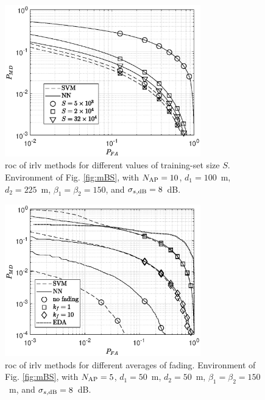 \documentclass[final,twocolumn]{IEEEtran}
\begin{document}
\begin{figure}[t]
    \centering
    \includegraphics[width=8.5cm]{res_training_10BS_2Class_newArea.eps}
    \caption{\ac{roc} of \ac{irlv} methods for different values of training-set size $S$. Environment of Fig. \ref{fig:mBS}, with  $N_{\rm AP}=10$, $d_1 = 100$~m, $d_2 = 225$~m, $\beta_1 = \beta_2 = 150$, and $\sigma_{s,{\rm dB}} = 8$~dB.}
    \label{fig:kf1_newArea}
\end{figure}


\begin{figure}[t]
    \centering
    \includegraphics[width=8.5cm]{res_fading_5BS_2Class.eps}
    \caption{\ac{roc} of \ac{irlv} methods for different averages of fading. Environment of Fig. \ref{fig:mBS}, with  $N_{\rm AP}=5$, $d_1 = 50 $~m, $d_2 = 50$~m, $\beta_1 = \beta_2 = 150$~m, and $\sigma_{s,{\rm dB}} = 8$~dB.}
    \label{fig:kf10-5}
\end{figure}
\end{document}
